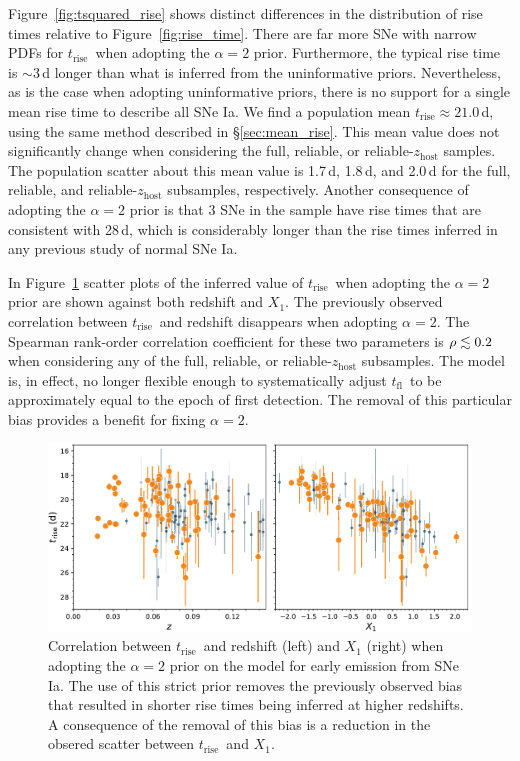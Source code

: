 \documentclass[twocolumn]{./aastex63}
\newcommand{\tfl}{$t_\mathrm{fl}$}
\newcommand{\trise}{$t_\mathrm{rise}$}
\begin{document}
Figure~\ref{fig:tsquared_rise} shows distinct differences in the distribution
of rise times relative to Figure~\ref{fig:rise_time}. There are far more SNe
with narrow PDFs for \trise\ when adopting the $\alpha = 2$ prior.
Furthermore, the typical rise time is $\sim$3\,d longer than what is inferred
from the uninformative priors. Nevertheless, as is the case when adopting
uninformative priors, there is no support for a single mean rise time to
describe all SNe Ia. We find a population mean \trise\;$\approx 21.0$\,d,
using the same method described in \S\ref{sec:mean_rise}. This mean value does
not significantly change when considering the full, reliable, or
reliable-$z_\mathrm{host}$ samples. The population scatter about this mean
value is 1.7\,d, 1.8\,d, and 2.0\,d for the full, reliable, and
reliable-$z_\mathrm{host}$ subsamples, respectively. Another consequence of
adopting the $\alpha = 2$ prior is that 3 SNe in the sample have rise times
that are consistent with 28\,d, which is considerably longer than the rise
times inferred in any previous study of normal SNe Ia.

In Figure~\ref{fig:tsquared_z_evolution} scatter plots of the inferred value
of \trise\ when adopting the $\alpha = 2$ prior are shown against both
redshift and $X_1$. The previously observed correlation between \trise\ and
redshift disappears when adopting $\alpha = 2$. The Spearman rank-order
correlation coefficient for these two parameters is $\rho \lesssim 0.2$ when
considering any of the full, reliable, or reliable-$z_\mathrm{host}$
subsamples. The model is, in effect, no longer flexible enough to
systematically adjust \tfl\ to be approximately equal to the epoch of first
detection. The removal of this particular bias provides a benefit for fixing
$\alpha = 2$.

\begin{figure}
    \centering
    \includegraphics[width=6in]{./figures/trise_z_tsquared.pdf}
    \caption{Correlation between \trise\ and redshift (left) and $X_1$ (right)
    when adopting the $\alpha = 2$ prior on the model for early emission from
    SNe Ia. The use of this strict prior removes the previously observed bias
    that resulted in shorter rise times being inferred at higher redshifts. A
    consequence of the removal of this bias is a reduction in the obsered
    scatter between \trise\ and $X_1$.}
    \label{fig:tsquared_z_evolution}
\end{figure}
\end{document}
